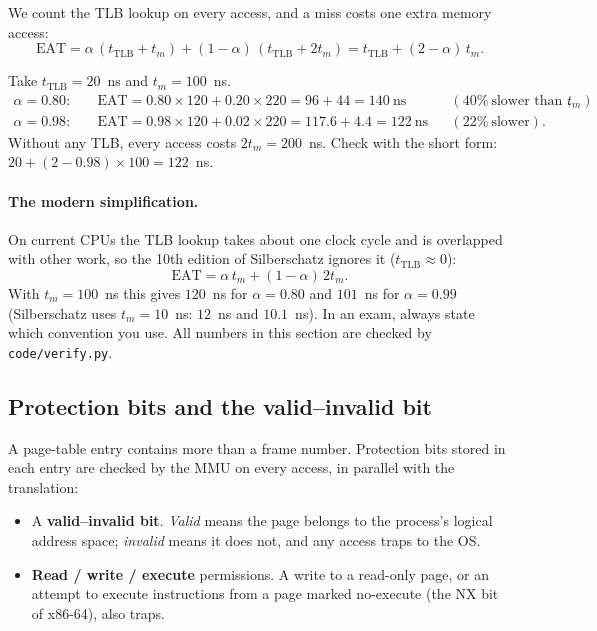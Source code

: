 \documentclass[11pt,a4paper]{article}
\newcommand{\term}[1]{\textbf{\color{mintdeep}#1}}
\begin{document}
\begin{keyidea}
We count the TLB lookup on every access, and a miss costs one extra memory access:
\[
\text{EAT} = \alpha\,(t_{\text{TLB}} + t_{m}) + (1-\alpha)\,(t_{\text{TLB}} + 2t_{m}) = t_{\text{TLB}} + (2-\alpha)\,t_{m}.
\]
\end{keyidea}

\begin{example}
Take $t_{\text{TLB}} = 20$~ns and $t_{m} = 100$~ns.
\begin{align*}
\alpha = 0.80:&\quad \text{EAT} = 0.80 \times 120 + 0.20 \times 220 = 96 + 44 = 140\ \text{ns} &&(40\%\ \text{slower than } t_m),\\
\alpha = 0.98:&\quad \text{EAT} = 0.98 \times 120 + 0.02 \times 220 = 117.6 + 4.4 = 122\ \text{ns} &&(22\%\ \text{slower}).
\end{align*}
Without any TLB, every access costs $2t_{m} = 200$~ns. Check with the short form: $20 + (2-0.98)\times100 = 122$~ns.
\end{example}

\paragraph{The modern simplification.} On current CPUs the TLB lookup takes about one clock cycle and is overlapped with other work, so the 10th edition of Silberschatz ignores it ($t_{\text{TLB}}\approx 0$):
\[
\text{EAT} = \alpha\,t_{m} + (1-\alpha)\,2t_{m}.
\]
With $t_{m} = 100$~ns this gives $120$~ns for $\alpha = 0.80$ and $101$~ns for $\alpha = 0.99$ (Silberschatz uses $t_{m}=10$~ns: $12$~ns and $10.1$~ns). In an exam, always state which convention you use. All numbers in this section are checked by \texttt{code/verify.py}.

\subsection{Protection bits and the valid--invalid bit}
\label{sec:protbits}

A page-table entry contains more than a frame number. Protection bits stored in each entry are checked by the MMU on every access, in parallel with the translation:
\begin{itemize}
  \item A \term{valid--invalid bit}. \emph{Valid} means the page belongs to the process's logical address space; \emph{invalid} means it does not, and any access traps to the OS.
  \item \textbf{Read / write / execute} permissions. A write to a read-only page, or an attempt to execute instructions from a page marked no-execute (the NX bit of x86-64), also traps.
\end{itemize}
\end{document}
